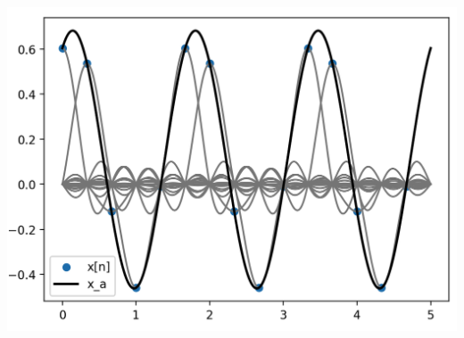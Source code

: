 \begin{listing}
    \begin{minipage}{0.49\textwidth}
        \strut\vspace*{-\baselineskip}\newline
        \inputminted[firstline=4]{python3}{code/sampling_theorem.py}
    \end{minipage}
    \begin{minipage}{0.49\textwidth}
        \strut\vspace*{-\baselineskip}\newline
        \includegraphics[width=\textwidth]{code/sampling_theorem.png}
    \end{minipage}
    \label{py:sampling_theorem}
\end{listing}

\FloatBarrier